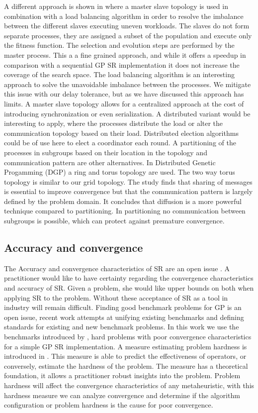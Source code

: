A different approach is shown in \citep{DFGPSR} where a master slave topology is used in combination with a load balancing algorithm in order to resolve the imbalance between the different slaves executing uneven workloads. The slaves do not form separate processes, they are assigned a subset of the population and execute only the fitness function. The selection and evolution steps are performed by the master process. This a a fine grained approach, and while it offers a speedup in comparison with a sequential GP SR implementation it does not increase the coverage of the search space. The load balancing algorithm is an interesting approach to solve the unavoidable imbalance between the processes. We mitigate this issue with our delay tolerance, but as we have discussed this approach has limits. A master slave topology allows for a centralized approach at the cost of introducing synchronization or even serialization. A distributed variant would be interesting to apply, where the processes distribute the load or alter the communication topology based on their load. Distributed election algorithms could be of use here to elect a coordinator each round. A partitioning of the processes in subgroups based on their location in the topology and communication pattern are other alternatives.
In Distributed Genetic Progamming (DGP) \cite{DGP} a ring and torus topology are used. The two way torus topology is similar to our grid topology. The study finds that sharing of messages is essential to improve convergence but that the communication pattern is largely defined by the problem domain. It concludes that diffusion is a more powerful technique compared to partitioning. In partitioning no communication between subgroups is possible, which can protect against premature convergence.

\subsection{Accuracy and convergence}
The Accuracy and convergence characteristics of SR are an open issue \citep{SRAccuracy, SRAccur, SRBaseline}. A practitioner would like to have certainty regarding the convergence characteristics and accuracy of SR. Given a problem, she would like upper bounds on both when applying SR to the problem. Without these acceptance of SR as a tool in industry will remain difficult.
Finding good benchmark problems for GP is an open issue, recent work \citep{GPBenchmarks} attempts at unifying existing benchmarks and defining standards for existing and new benchmark problems. In this work we use the benchmarks introduced by \cite{SRAccuracy}, hard problems with poor convergence characteristics for a simple GP SR implementation.
A measure estimating problem hardness is introduced in \citep{GPHardness}. This measure is able to predict the effectiveness of operators, or conversely, estimate the hardness of the problem. The measure has a theoretical foundation, it allows a practitioner robust insights into the problem. Problem hardness will affect the convergence characteristics of any metaheuristic, with this hardness measure we can analyze convergence and determine if the algorithm configuration or problem hardness is the cause for poor convergence.